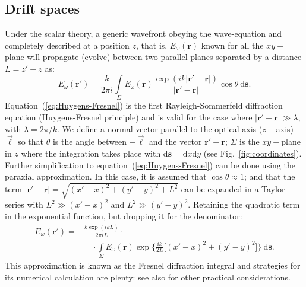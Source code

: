 \documentclass[preprint]{iucr}
\newcommand{\inred}[1]{{\color{red}#1}}
\begin{document}
\subsection{Drift spaces}\label{sec:free_space}

Under the scalar theory, a generic wavefront obeying the wave-equation and completely described at a position $z$, that is, $E_\omega(\textbf{r})$ known for all the $xy-$plane will propagate (evolve) between two parallel planes separated by a distance $L=z'-z$ as: 
\begin{equation}\label{eq:Huygens-Fresnel}
    E_\omega(\textbf{r}') = \frac{k}{2\pi i}\int\limits_{\Sigma}{E_\omega(\textbf{r})\frac{\exp{(ik\vert\textbf{r}' - \textbf{r}\vert)}}{\vert\textbf{r}' - \textbf{r}\vert}\cos{\theta}~\mathrm{d}\textbf{s}}.
\end{equation}
Equation~(\ref{eq:Huygens-Fresnel}) is the first Rayleigh-Sommerfeld diffraction equation (Huygens-Fresnel principle) and is valid for the case where $\vert\textbf{r}' - \textbf{r}\vert\gg\lambda$, with $\lambda=2\pi \big/ k$. We define a normal vector parallel to the optical axis ($z-$axis) $\vec{\ell}$ so that $\theta$ is the angle between $-\vec{\ell}$ and the vector $\textbf{r}'-\textbf{r}$; $\Sigma$ is the $xy-$plane in $z$ where the integration takes place with $\mathrm{d}\textbf{s}=\mathrm{d}x\mathrm{d}y$ (see Fig.~\ref{fig:coordinates}). Further simplification to equation~(\ref{eq:Huygens-Fresnel}) can be done using the paraxial approximation. In this case, it is assumed that $\cos{\theta}\approx1$; and that the term $\vert\textbf{r}' - \textbf{r}\vert=\sqrt{(x'-x)^2 + (y'-y)^2 + L^2}$ can be expanded in a Taylor series with $L^2\gg(x'-x)^2$ and $L^2\gg(y'-y)^2$. Retaining the quadratic term in the exponential function, but dropping it for the denominator:
\begin{equation}\label{eq:Fresnel}
\begin{split}
    E_\omega(\textbf{r}') = &\frac{k\exp{(ikL)}}{2\pi i L}\cdot \\
    &\quad\cdot\int\limits_{\Sigma}{E_\omega(\textbf{r})\exp{\bigg\{ \frac{ik}{2L}\big[ (x'-x)^2 + (y'-y)^2 \big]\bigg\}}~\mathrm{d}\textbf{s}}.
\end{split}
\end{equation}
This approximation is know\inred{n} as the Fresnel diffraction integral and strategies for its numerical calculation are plenty: \cite{Kelly2014,Goodman2017} see also \cite{Rees87, Stern2004, Zhang2020} for other practical considerations.
\end{document}
